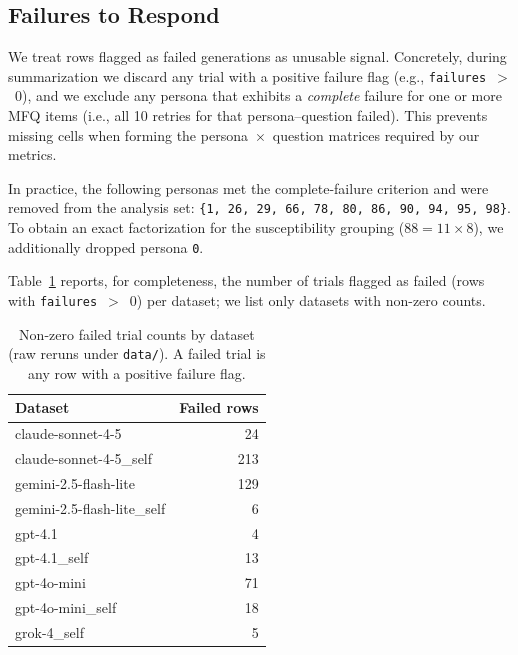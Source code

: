 \documentclass{article}
\begin{document}
\subsection{Failures to Respond}
\label{sec:failures}
We treat rows flagged as failed generations as unusable signal. Concretely, during summarization we discard any trial with a positive failure flag (e.g., \texttt{failures}~$>$~0), and we exclude any persona that exhibits a \emph{complete} failure for one or more MFQ items (i.e., all 10 retries for that persona–question failed). This prevents missing cells when forming the persona~\(\times\)~question matrices required by our metrics.

In practice, the following personas met the complete-failure criterion and were removed from the analysis set: \texttt{\{1, 26, 29, 66, 78, 80, 86, 90, 94, 95, 98\}}. To obtain an exact factorization for the susceptibility grouping (\(88 = 11 \times 8\)), we additionally dropped persona \texttt{0}.

Table~\ref{tab:failures_by_model} reports, for completeness, the number of trials flagged as failed (rows with \texttt{failures}~$>$~0) per dataset; we list only datasets with non-zero counts.

\begin{table}[t]
  \centering
  \caption{Non-zero failed trial counts by dataset (raw reruns under \texttt{data/}). A failed trial is any row with a positive failure flag.}
  \label{tab:failures_by_model}
  \begin{tabular}{lr}
    \toprule
    Dataset & Failed rows \\
    \midrule
    claude-sonnet-4-5 & 24 \\
    claude-sonnet-4-5\_self & 213 \\
    gemini-2.5-flash-lite & 129 \\
    gemini-2.5-flash-lite\_self & 6 \\
    gpt-4.1 & 4 \\
    gpt-4.1\_self & 13 \\
    gpt-4o-mini & 71 \\
    gpt-4o-mini\_self & 18 \\
    grok-4\_self & 5 \\
    \bottomrule
  \end{tabular}
\end{table}
\end{document}
